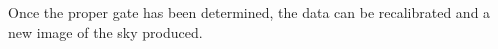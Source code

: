 \documentclass[a4paper,12pt]{article}
\begin{document}
                                                                                                                                                                                                                                                                                                                                                                                                                                                                                                                                                                                                                                                                                                                                                                                                                                                                                                                                                                                                                                                                                                                                                                                                                                                                                                                                                                                                                                                                                                                                                                                                                                                                                                                                                                                                                                                                                                                                                                                                                                                                                                                                                                                                                                                                                                                                                                                                                                                                                                                                                                                                                                                                                                                                                                                                                                                                                                                                                                                                                                                                                                                                                                                                                                                                                                                                                          Once the proper gate has been determined, the data can be recalibrated and a new image of the sky produced. 
\end{document}
